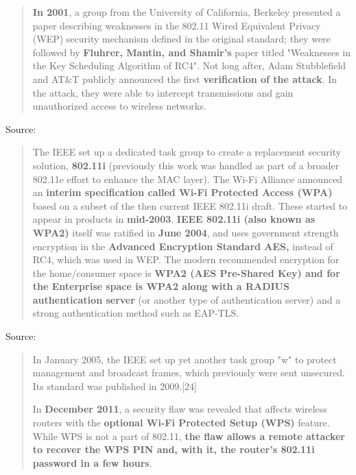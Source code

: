 \documentclass[Screen16to9,17pt]{foils}
\begin{document}

\begin{quote}
{\bf In 2001}, a group from the University of California, Berkeley presented a paper describing weaknesses in the 802.11 Wired Equivalent Privacy (WEP) security mechanism defined in the original standard; they were followed by {\bf Fluhrer, Mantin, and Shamir's} paper titled "Weaknesses in the Key Scheduling Algorithm of RC4". Not long after, Adam Stubblefield and AT\&T publicly announced the first {\bf verification of the attack}. In the attack, they were able to intercept transmissions and gain unauthorized access to wireless networks.
\end{quote}
Source: 


\begin{quote}
The IEEE set up a dedicated task group to create a replacement security solution, {\bf 802.11i} (previously this work was handled as part of a broader 802.11e effort to enhance the MAC layer). The Wi-Fi Alliance announced an {\bf interim specification called Wi-Fi Protected Access (WPA)} based on a subset of the then current IEEE 802.11i draft. These started to appear in products in {\bf mid-2003}. {\bf IEEE 802.11i (also known as WPA2)} itself was ratified in {\bf June 2004}, and uses government strength encryption in the {\bf Advanced Encryption Standard AES,} instead of RC4, which was used in WEP. The modern recommended encryption for the home/consumer space is {\bf WPA2 (AES Pre-Shared Key) and for the Enterprise space is WPA2 along with a RADIUS authentication server} (or another type of authentication server) and a strong authentication method such as EAP-TLS.
\end{quote}
Source: 


\begin{quote}
In January 2005, the IEEE set up yet another task group "w" to protect management and broadcast frames, which previously were sent unsecured. Its standard was published in 2009.[24]

In {\bf December 2011}, a security flaw was revealed that affects wireless routers with the {\bf optional Wi-Fi Protected Setup (WPS)} feature. While WPS is not a part of 802.11, {\bf the flaw allows a remote attacker to recover the WPS PIN and, with it, the router's 802.11i password in a few hours}.
\end{quote}
\end{document}
